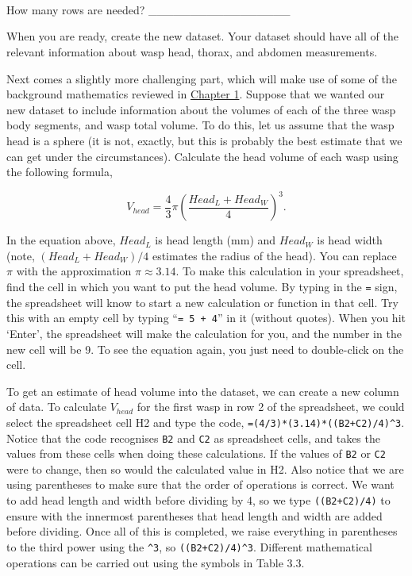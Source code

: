 \documentclass[
  openany]{scrbook}
\begin{document}
\begin{verbatim}




\end{verbatim}

How many rows are needed? \_\_\_\_\_\_\_\_\_\_\_\_\_\_\_\_\_

When you are ready, create the new dataset.
Your dataset should have all of the relevant information about wasp head, thorax, and abdomen measurements.

Next comes a slightly more challenging part, which will make use of some of the background mathematics reviewed in \protect\hyperlink{Chapter_1}{Chapter 1}.
Suppose that we wanted our new dataset to include information about the volumes of each of the three wasp body segments, and wasp total volume.
To do this, let us assume that the wasp head is a sphere (it is not, exactly, but this is probably the best estimate that we can get under the circumstances).
Calculate the head volume of each wasp using the following formula,

\[V_{head} = \frac{4}{3}\pi \left(\frac{Head_L + Head_W}{4}\right)^{3}.\]

In the equation above, \(Head_{L}\) is head length (mm) and \(Head_{W}\) is head width (note, \((Head_L + Head_W)/4\) estimates the radius of the head).
You can replace \(\pi\) with the approximation \(\pi \approx 3.14\).
To make this calculation in your spreadsheet, find the cell in which you want to put the head volume.
By typing in the \texttt{=} sign, the spreadsheet will know to start a new calculation or function in that cell.
Try this with an empty cell by typing ``\texttt{=\ 5\ +\ 4}'' in it (without quotes).
When you hit `Enter', the spreadsheet will make the calculation for you, and the number in the new cell will be 9.
To see the equation again, you just need to double-click on the cell.

To get an estimate of head volume into the dataset, we can create a new column of data.
To calculate \(V_{head}\) for the first wasp in row 2 of the spreadsheet, we could select the spreadsheet cell H2 and type the code, \texttt{=(4/3)*(3.14)*((B2+C2)/4)\^{}3}.
Notice that the code recognises \texttt{B2} and \texttt{C2} as spreadsheet cells, and takes the values from these cells when doing these calculations.
If the values of \texttt{B2} or \texttt{C2} were to change, then so would the calculated value in H2.
Also notice that we are using parentheses to make sure that the order of operations is correct.
We want to add head length and width before dividing by 4, so we type \texttt{((B2+C2)/4)} to ensure with the innermost parentheses that head length and width are added before dividing.
Once all of this is completed, we raise everything in parentheses to the third power using the \texttt{\^{}3}, so \texttt{((B2+C2)/4)\^{}3}.
Different mathematical operations can be carried out using the symbols in Table 3.3.
\end{document}
